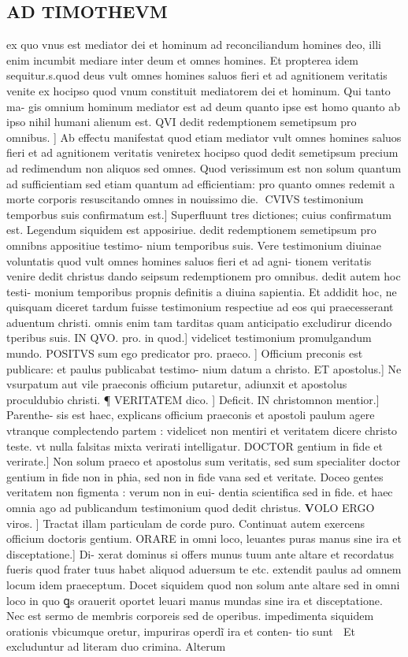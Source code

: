 \documentclass{article}
\begin{document}
\begin{pages}
\section*{AD TIMOTHEVM }\pstart ex quo vnus est mediator dei et hominum ad reconciliandum homines deo, illi enim incumbit mediare inter deum et omnes homines. Et propterea idem sequitur.s.quod deus vult omnes homines saluos fieri et ad agnitionem veritatis venite ex hocipso quod vnum constituit mediatorem dei et hominum. Qui tanto ma- gis omnium hominum mediator est ad deum quanto ipse est homo quanto ab ipso nihil humani alienum est. QVI dedit redemptionem semetipsum pro omnibus. ] Ab effectu manifestat quod etiam mediator vult omnes homines saluos fieri et ad agnitionem veritatis veniretex hocipso quod dedit semetipsum precium ad redimendum non aliquos sed omnes. Quod verissimum est non solum quantum ad sufficientiam sed etiam quantum ad efficientiam: pro quanto omnes redemit a morte corporis resuscitando omnes in nouissimo die. CVIVS testimonium temporbus suis confirmatum est.] Superfluunt tres dictiones; cuius confirmatum est. Legendum siquidem est apposiriue. dedit redemptionem semetipsum pro omnibns appositiue testimo- nium temporibus suis. Vere testimonium diuinae voluntatis quod vult omnes homines saluos fieri et ad agni- tionem veritatis venire dedit christus dando seipsum redemptionem pro omnibus. dedit autem hoc testi- monium temporibus propnis definitis a diuina sapientia. Et addidit hoc, ne quisquam diceret tardum fuisse testimonium respectiue ad eos qui praecesserant aduentum christi. omnis enim tam tarditas quam anticipatio excludirur dicendo tperibus suis. IN QVO. pro. in quod.] videlicet testimonium promulgandum mundo. POSITVS sum ego predicator pro. praeco. ] Officium preconis est publicare: et paulus publicabat testimo- nium datum a christo. ET apostolus.] Ne vsurpatum aut vile praeconis officium putaretur, adiunxit et apostolus proculdubio christi. ¶ VERITATEM dico. ] Deficit. IN christomnon mentior.] Parenthe- sis est haec, explicans officium praeconis et apostoli paulum agere vtranque complectendo partem : videlicet non mentiri et veritatem dicere christo teste. vt nulla falsitas mixta verirati intelligatur. DOCTOR gentium in fide et verirate.] Non solum praeco et apostolus sum veritatis, sed sum specialiter doctor gentium in fide  non in pħia, sed non in fide vana sed et veritate. Doceo gentes veritatem non figmenta : verum non in eui- dentia scientifica sed in fide. et haec omnia ago ad publicandum testimonium quod dedit christus.  \pend\pstart \huge\textbf{V}\normalsize OLO ERGO viros. ] Tractat illam particulam de corde puro. Continuat autem exercens officium doctoris gentium. ORARE in omni loco, leuantes puras manus sine ira et disceptatione.] Di- xerat dominus si offers munus tuum ante altare et recordatus fueris quod frater tuus habet aliquod aduersum te etc.  extendit paulus ad omnem locum idem praeceptum. Docet siquidem quod non solum ante altare sed in omni loco in quo ꝗs orauerit oportet leuari manus mundas sine ira et disceptatione. Nec est sermo de membris corporeis sed de operibus. impedimenta siquidem orationis vbicumque oretur, impuriras operdĩ ira et conten- tio sunt  Et excluduntur ad literam duo crimina. Alterum 
\end{pages}
\end{document}
